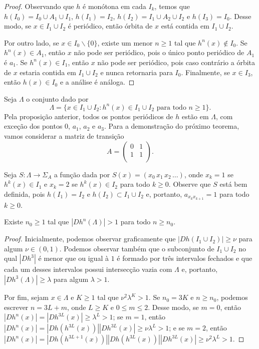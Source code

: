 \begin{proof}
Observando que $h$ é monótona em cada $I_k$, temos que $h(I_0) = I_0 \cup A_1 \cup I_1$, $h(I_1) = I_2$, $h(I_2) = I_1 \cup A_2 \cup I_2$ e $h(I_3) = I_0$. Desse modo, se $x \in I_1 \cup I_2$ é periódico, então órbita de $x$ está contida em $I_1 \cup I_2$.

Por outro lado, se $x \in I_0 \backslash \lbrace 0 \rbrace$, existe um menor $n \geq 1$ tal que $h^n(x) \notin I_0$. Se $h^n(x) \in A_1$, então $x$ não pode ser periódico, pois o único ponto periódico de $A_1$ é $a_1$.
Se $h^n(x) \in I_1$, então $x$ não pode ser periódico, pois caso contrário a órbita de $x$ estaria contida em $I_1 \cup I_2$ e nunca retornaria para $I_0$.
Finalmente, se $x \in I_3$, então $h(x) \in I_0$ e a análise é análoga.
\end{proof}

Seja $\Lambda$ o conjunto dado por
$$\Lambda = \lbrace x \in I_1 \cup I_2 : h^n(x) \in I_1 \cup I_2 \text{ para todo } n \geq 1 \rbrace.$$
Pela proposição anterior, todos os pontos periódicos de $h$ estão em $\Lambda$, com exceção dos pontos $0$, $a_1$, $a_2$ e $a_3$.
Para a demonstração do próximo teorema, vamos considerar a matriz de transição
$$A =
\begin{pmatrix}
0 & 1 \\
1 & 1 \\
\end{pmatrix}.$$

Seja $S: \Lambda \to \Sigma_A$ a função dada por $S(x) = (x_0 \, x_1 \, x_2 \, \dots)$, onde $x_k = 1$ se $h^k(x) \in I_1$ e $x_k = 2$ se $h^k(x) \in I_2$ para todo $k \geq 0$. Observe que $S$ está bem definida, pois $h(I_1) = I_2$ e $h(I_2) \subset I_1 \cup I_2$ e, portanto, $a_{x_k x_{k+1}} = 1$ para todo $k \geq 0$. 


\begin{lemma}
Existe $n_0 \geq 1$ tal que $|D h^n(\Lambda)| > 1$ para todo $n \geq n_0$.
\end{lemma}

\begin{proof}
Inicialmente, podemos observar graficamente que $|D h(I_1 \cup I_2)| \geq \nu$ para algum $\nu \in (0, 1)$.
Podemos observar também que o subconjunto de $I_1 \cup I_2$ no qual $|D h^3|$ é menor que ou igual à $1$ é formado por três intervalos fechados e que cada um desses intervalos possui intersecção vazia com $\Lambda$ e, portanto, $|D h^3(\Lambda)| \geq \lambda$ para algum $\lambda > 1$.

Por fim, sejam $x \in \Lambda$ e $K \geq 1$ tal que $\nu^2 \lambda^K > 1$. Se $n_0 = 3K$ e $n \geq n_0$, podemos escrever $n = 3L + m$, onde $L \geq K$ e $0 \leq m \leq 2$. Desse modo, se $m = 0$, então $ |D h^n(x)| = |D h^{3L}(x)|
\geq \lambda^L > 1$; se $m = 1$, então $|D h^n(x)| = |D h(h^{3L}(x))| |D h^{3L}(x)| \geq \nu \lambda^L > 1$; e se $m = 2$, então $|D h^n(x)| = |D h(h^{3L+1}(x))| |D h(h^{3L}(x))| |D h^{3L}(x)| \geq \nu^2 \lambda^L > 1$.
\end{proof}

